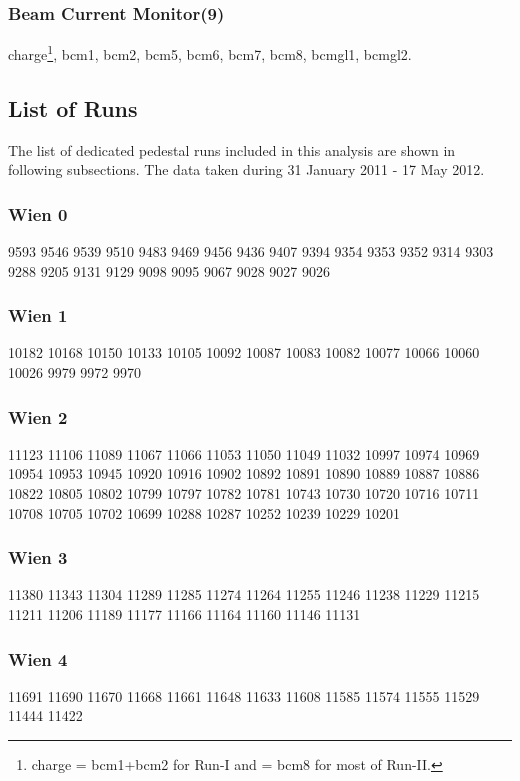 \subsubsection{Beam Current Monitor(9)}
\label{Beam Current Monitor}
charge\footnote{charge = bcm1+bcm2 for Run-I and = bcm8 for most of Run-II.}, bcm1, bcm2, bcm5, bcm6, bcm7, bcm8, bcmgl1, bcmgl2.\\

\subsection{List of Runs}
\label{List of Runs}
The list of dedicated pedestal runs included in this analysis are shown in following subsections. The data taken during 31 January 2011 - 17 May 2012.

\subsubsection{Wien 0}
\label{Wien 0}
9593
9546
9539
9510
9483
9469
9456
9436
9407
9394
9354
9353
9352
9314
9303
9288
9205
9131
9129
9098
9095
9067
9028
9027
9026

\subsubsection{Wien 1}
\label{Wien 1}
10182
10168
10150
10133
10105
10092
10087
10083
10082
10077
10066
10060
10026
9979
9972
9970

\subsubsection{Wien 2}
\label{Wien 2}
11123
11106
11089
11067
11066
11053
11050
11049
11032
10997
10974
10969
10954
10953
10945
10920
10916
10902
10892
10891
10890
10889
10887
10886
10822
10805
10802
10799
10797
10782
10781
10743
10730
10720
10716
10711
10708
10705
10702
10699
10288
10287
10252
10239
10229
10201

\subsubsection{Wien 3}
\label{Wien 3}
11380
11343
11304
11289
11285
11274
11264
11255
11246
11238
11229
11215
11211
11206
11189
11177
11166
11164
11160
11146
11131

\subsubsection{Wien 4}
\label{Wien 4}
11691
11690
11670
11668
11661
11648
11633
11608
11585
11574
11555
11529
11444
11422

